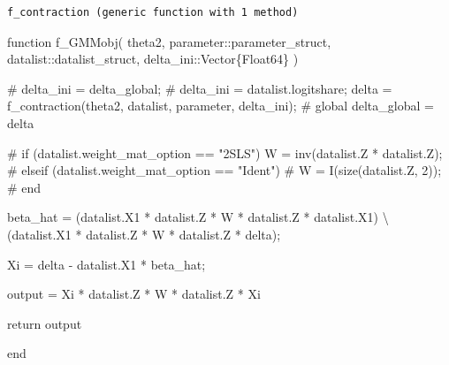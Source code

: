 \documentclass[
  letterpaper,
  DIV=11,
  numbers=noendperiod]{scrreprt}
\newenvironment{Shaded}{\begin{snugshade}}{\end{snugshade}}
\newcommand{\CommentTok}[1]{\textcolor[rgb]{0.37,0.37,0.37}{#1}}
\newcommand{\ControlFlowTok}[1]{\textcolor[rgb]{0.00,0.23,0.31}{#1}}
\newcommand{\DataTypeTok}[1]{\textcolor[rgb]{0.68,0.00,0.00}{#1}}
\newcommand{\FunctionTok}[1]{\textcolor[rgb]{0.28,0.35,0.67}{#1}}
\newcommand{\KeywordTok}[1]{\textcolor[rgb]{0.00,0.23,0.31}{#1}}
\newcommand{\NormalTok}[1]{\textcolor[rgb]{0.00,0.23,0.31}{#1}}
\newcommand{\OperatorTok}[1]{\textcolor[rgb]{0.37,0.37,0.37}{#1}}
\begin{document}
\begin{verbatim}
f_contraction (generic function with 1 method)
\end{verbatim}

\begin{Shaded}
\begin{Highlighting}[]
\KeywordTok{function} \FunctionTok{f\_GMMobj}\NormalTok{(}
\NormalTok{        theta2,}
\NormalTok{        parameter}\OperatorTok{::}\DataTypeTok{parameter\_struct}\NormalTok{,}
\NormalTok{        datalist}\OperatorTok{::}\DataTypeTok{datalist\_struct}\NormalTok{,}
\NormalTok{        delta\_ini}\OperatorTok{::}\DataTypeTok{Vector\{Float64\}}
\NormalTok{    )}
    
\CommentTok{\#     delta\_ini = delta\_global;}
\CommentTok{\#     delta\_ini = datalist.logitshare;}
\NormalTok{    delta }\OperatorTok{=} \FunctionTok{f\_contraction}\NormalTok{(theta2, datalist, parameter, delta\_ini);}
\CommentTok{\#     global delta\_global = delta}
    
\CommentTok{\#     if (datalist.weight\_mat\_option == "2SLS") }
\NormalTok{        W }\OperatorTok{=} \FunctionTok{inv}\NormalTok{(datalist.Z}\OperatorTok{\textquotesingle{}} \OperatorTok{*}\NormalTok{ datalist.Z);}
\CommentTok{\#     elseif (datalist.weight\_mat\_option == "Ident")}
\CommentTok{\#         W = I(size(datalist.Z, 2));}
\CommentTok{\#     end}
    
\NormalTok{    beta\_hat }\OperatorTok{=}\NormalTok{ (datalist.X1}\OperatorTok{\textquotesingle{}} \OperatorTok{*}\NormalTok{ datalist.Z }\OperatorTok{*}\NormalTok{ W }\OperatorTok{*}\NormalTok{ datalist.Z}\OperatorTok{\textquotesingle{}} \OperatorTok{*}\NormalTok{ datalist.X1) }\OperatorTok{\textbackslash{}}\NormalTok{ (datalist.X1}\OperatorTok{\textquotesingle{}} \OperatorTok{*}\NormalTok{ datalist.Z }\OperatorTok{*}\NormalTok{ W }\OperatorTok{*}\NormalTok{ datalist.Z}\OperatorTok{\textquotesingle{}} \OperatorTok{*}\NormalTok{ delta);}
    
\NormalTok{    Xi }\OperatorTok{=}\NormalTok{ delta }\OperatorTok{{-}}\NormalTok{ datalist.X1 }\OperatorTok{*}\NormalTok{ beta\_hat;}
    
\NormalTok{    output }\OperatorTok{=}\NormalTok{ Xi}\OperatorTok{\textquotesingle{}} \OperatorTok{*}\NormalTok{ datalist.Z }\OperatorTok{*}\NormalTok{ W }\OperatorTok{*}\NormalTok{ datalist.Z}\OperatorTok{\textquotesingle{}} \OperatorTok{*}\NormalTok{ Xi}
        
    \ControlFlowTok{return}\NormalTok{ output}
    
\KeywordTok{end}    
\end{Highlighting}
\end{Shaded}
\end{document}
